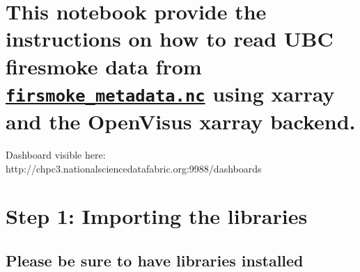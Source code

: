\documentclass[
  letterpaper,
  DIV=11,
  numbers=noendperiod]{scrreprt}
\begin{document}
\section{\texorpdfstring{This notebook provide the instructions on how
to read UBC firesmoke data from
\href{https://github.com/sci-visus/NSDF-WIRED/raw/main/data/firesmoke_metadata.nc}{\texttt{firsmoke\_metadata.nc}}
using xarray and the OpenVisus xarray
backend.}{This notebook provide the instructions on how to read UBC firesmoke data from firsmoke\_metadata.nc using xarray and the OpenVisus xarray backend.}}\label{this-notebook-provide-the-instructions-on-how-to-read-ubc-firesmoke-data-from-firsmoke_metadata.nc-using-xarray-and-the-openvisus-xarray-backend.}

Dashboard visible here:
http://chpc3.nationalsciencedatafabric.org:9988/dashboards

\section{\texorpdfstring{\textbf{Step 1: Importing the
libraries}}{Step 1: Importing the libraries}}\label{step-1-importing-the-libraries}

\subsection{Please be sure to have libraries
installed}\label{please-be-sure-to-have-libraries-installed}
\end{document}
